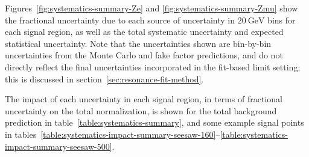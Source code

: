 Figures~\ref{fig:systematics-summary-Ze} and \ref{fig:systematics-summary-Zmu} show the fractional uncertainty due to each source of uncertainty in $\SI{20}{\giga\electronvolt}$ bins for each signal region, as well as the total systematic uncertainty and expected statistical uncertainty. Note that the uncertainties shown are bin-by-bin uncertainties from the Monte Carlo and fake factor predictions, and do not directly reflect the final uncertainties incorporated in the fit-based limit setting; this is discussed in section~\ref{sec:resonance-fit-method}.  %

The impact of each uncertainty in each signal region, in terms of fractional uncertainty on the total normalization, is shown for the total background prediction in table~\ref{table:systematics-summary}, and some example signal points in tables~\ref{table:systematics-impact-summary-seesaw-160}--\ref{table:systematics-impact-summary-seesaw-500}. %


